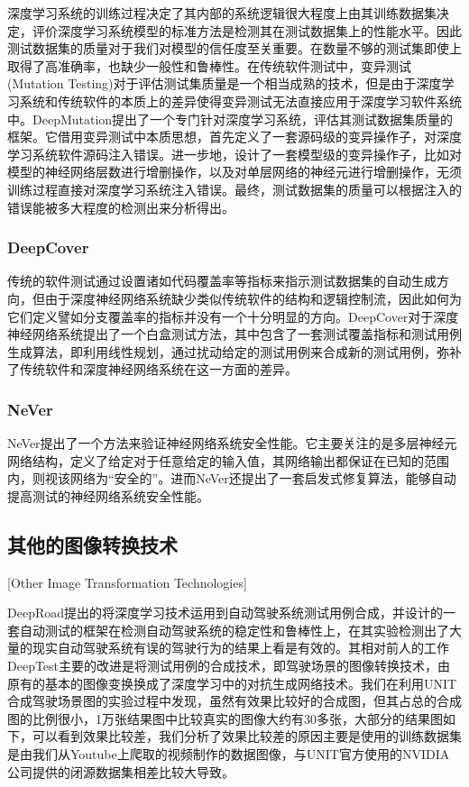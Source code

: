 深度学习系统的训练过程决定了其内部的系统逻辑很大程度上由其训练数据集决定，评价深度学习系统模型的标准方法是检测其在测试数据集上的性能水平。因此测试数据集的质量对于我们对模型的信任度至关重要。在数量不够的测试集即使上取得了高准确率，也缺少一般性和鲁棒性。在传统软件测试中，变异测试(Mutation Testing)对于评估测试集质量是一个相当成熟的技术，但是由于深度学习系统和传统软件的本质上的差异使得变异测试无法直接应用于深度学习软件系统中。DeepMutation提出了一个专门针对深度学习系统，评估其测试数据集质量的框架。它借用变异测试中本质思想，首先定义了一套源码级的变异操作子，对深度学习系统软件源码注入错误。进一步地，设计了一套模型级的变异操作子，比如对模型的神经网络层数进行增删操作，以及对单层网络的神经元进行增删操作，无须训练过程直接对深度学习系统注入错误。最终，测试数据集的质量可以根据注入的错误能被多大程度的检测出来分析得出。

\subsubsection{DeepCover}

传统的软件测试通过设置诸如代码覆盖率等指标来指示测试数据集的自动生成方向，但由于深度神经网络系统缺少类似传统软件的结构和逻辑控制流，因此如何为它们定义譬如分支覆盖率的指标并没有一个十分明显的方向。DeepCover\cite{DeepCover}对于深度神经网络系统提出了一个白盒测试方法，其中包含了一套测试覆盖指标和测试用例生成算法，即利用线性规划，通过扰动给定的测试用例来合成新的测试用例，弥补了传统软件和深度神经网络系统在这一方面的差异。

\subsubsection{NeVer}

NeVer\cite{dsv}提出了一个方法来验证神经网络系统安全性能。它主要关注的是多层神经元网络结构，定义了给定对于任意给定的输入值，其网络输出都保证在已知的范围内，则视该网络为“安全的”。进而NeVer还提出了一套启发式修复算法，能够自动提高测试的神经网络系统安全性能。

\subsection{其他的图像转换技术}[Other Image Transformation Technologies]

DeepRoad提出的将深度学习技术运用到自动驾驶系统测试用例合成，并设计的一套自动测试的框架在检测自动驾驶系统的稳定性和鲁棒性上，在其实验检测出了大量的现实自动驾驶系统有误的驾驶行为的结果\cite{DeepRoad}上看是有效的。其相对前人的工作DeepTest主要的改进是将测试用例的合成技术，即驾驶场景的图像转换技术，由原有的基本的图像变换换成了深度学习中的对抗生成网络技术。我们在利用UNIT合成驾驶场景图的实验过程中发现，虽然有效果比较好的合成图，但其占总的合成图的比例很小，1万张结果图中比较真实的图像大约有30多张，大部分的结果图如下，可以看到效果比较差，我们分析了效果比较差的原因主要是使用的训练数据集是由我们从Youtube上爬取的视频制作的数据图像，与UNIT官方使用的NVIDIA公司提供的闭源数据集相差比较大导致。

